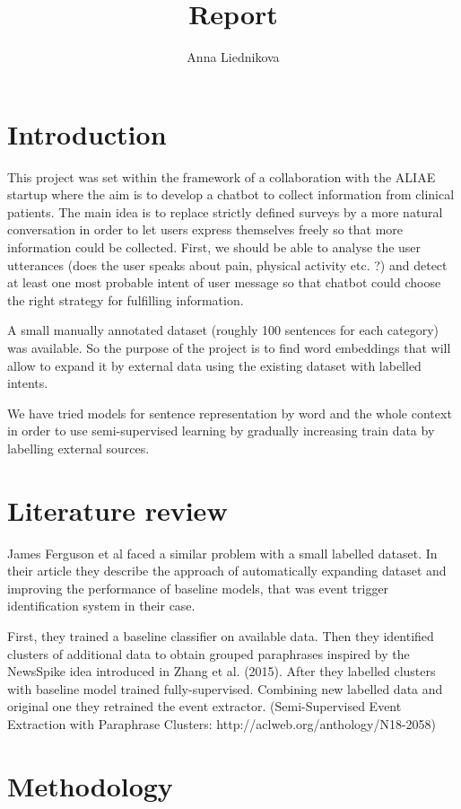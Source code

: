 \documentclass[11pt]{article}
\title{Report}
\author{Anna Liednikova}
\begin{document}
\section{Introduction}

 
This project was set within the framework of a collaboration with the ALIAE startup where the aim is to develop a chatbot to collect information from clinical patients. The main idea is to replace strictly defined surveys by a more natural conversation in order to let users express themselves freely so that more information could be collected. First, we should be able to analyse the user utterances (does the user speaks about pain, physical activity etc. ?) and detect at least one most probable intent of user message so that chatbot could choose the right strategy for fulfilling information.


A small manually annotated dataset (roughly 100 sentences for each category) was available. So the purpose of the project is to find word embeddings that will allow to expand it by external data using the existing dataset with labelled intents.

We have tried models for sentence representation by word and the whole context in order to use semi-supervised learning by gradually increasing train data by labelling external sources.

\section{Literature review}

James Ferguson et al faced a similar problem with a small labelled dataset. In their article they describe the approach of automatically expanding dataset and improving the performance of baseline models, that was event trigger identification system in their case.

First, they trained a baseline classifier on available data. Then they identified clusters of additional data to obtain grouped paraphrases inspired by the NewsSpike idea introduced in Zhang et al. (2015). After they labelled clusters with baseline model trained fully-supervised. Combining new labelled data and original one they retrained the event extractor. (Semi-Supervised Event Extraction with Paraphrase Clusters: http://aclweb.org/anthology/N18-2058)



\section{Methodology}
\end{document}
